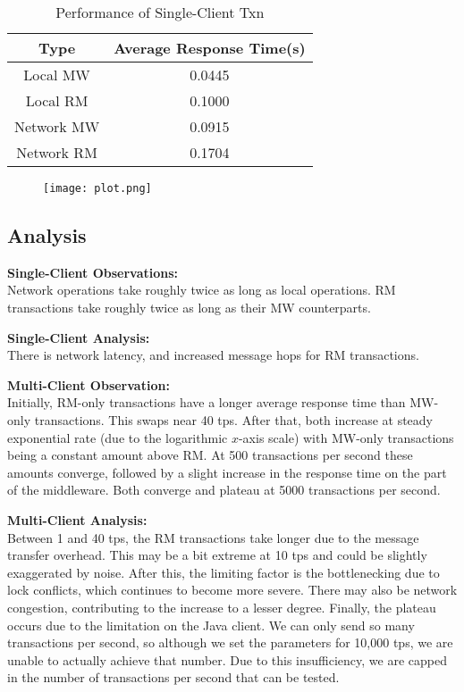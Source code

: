 \documentclass[11pt]{article}
\begin{document}
\begin{table}[H]
\centering
\caption{Performance of Single-Client Txn}
\begin{tabular}{c|c}
Type & Average Response Time(s) \\
\hline
Local MW & 0.0445 \\
Local RM & 0.1000 \\
Network MW & 0.0915 \\
Network RM & 0.1704 \\
\end{tabular}
\end{table}

\begin{figure}[H]
\centering
\texttt{[image: plot.png]}
\end{figure}

\subsection*{Analysis}

\textbf{Single-Client Observations:} \\
Network operations take roughly twice as long as local operations. RM transactions take roughly twice as long as their MW counterparts.\par

\textbf{Single-Client Analysis:} \\
There is network latency, and increased message hops for RM transactions. \par

\textbf{Multi-Client Observation:}\\
Initially, RM-only transactions have a longer average response time than MW-only transactions. This swaps near 40 tps. After that, both increase at steady exponential rate (due to the logarithmic $x$-axis scale) with MW-only transactions being a constant amount above RM. At 500 transactions per second these amounts converge, followed by a slight increase in the response time on the part of the middleware. Both converge and plateau at 5000 transactions per second. \par

\textbf{Multi-Client Analysis:}\\
Between 1 and 40 tps, the RM transactions take longer due to the message transfer overhead. This may be a bit extreme at 10 tps and could be slightly exaggerated by noise. After this, the limiting factor is the bottlenecking due to lock conflicts, which continues to become more severe. There may also be network congestion, contributing to the increase to a lesser degree. Finally, the plateau occurs due to the limitation on the Java client. We can only send so many transactions per second, so although we set the parameters for 10,000 tps, we are unable to actually achieve that number. Due to this insufficiency, we are capped in the number of transactions per second that can be tested.
\end{document}
